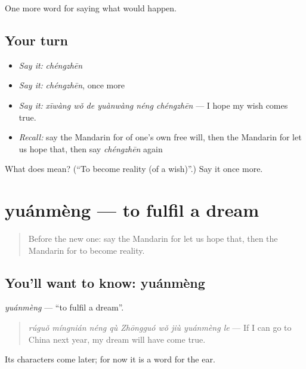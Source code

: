 \begin{grammarlens}[title={What you've built}]
One more word for saying what would happen.
\end{grammarlens}

\subsection*{Your turn}
\begin{itemize}
\raggedright
  \item \emph{Say it:} \emph{chéngzhēn}
  \item \emph{Say it:} \emph{chéngzhēn}, once more
  \item \emph{Say it:} \emph{xīwàng wǒ de yuànwàng néng chéngzhēn} — I hope my wish comes true.
  \item \emph{Recall:} say the Mandarin for of one's own free will, then the Mandarin for let us hope that, then say \emph{chéngzhēn} again
\end{itemize}

\begin{tcolorbox}[breakable,colback=teal!4,colframe=teal!35!black,title={Before you move on}]
What does  mean? (\textquotedblleft{}To become reality (of a wish)\textquotedblright{}.) Say it once more.
\end{tcolorbox}
\section[yuánmèng]{yuánmèng — to fulfil a dream}

\label{lesson:ZH-C536-yuanmeng}



\begin{quote}
Before the new one: say the Mandarin for let us hope that, then the Mandarin for to become reality.
\end{quote}

\subsection*{You'll want to know: yuánmèng}
\emph{yuánmèng} — \textquotedblleft{}to fulfil a dream\textquotedblright{}.

\begin{quote}
\emph{rúguǒ míngnián néng qù Zhōngguó wǒ jiù yuánmèng le} — If I can go to China next year, my dream will have come true.
\end{quote}

Its characters come later; for now it is a word for the ear.

